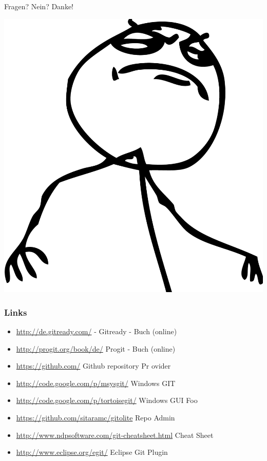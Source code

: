 \documentclass{beamer}
\begin{document}
			\begin{frame}
				Fragen? Nein? Danke!

				\begin{center}
					\includegraphics[height=0.4\textheight]{img/fuck-yeah}
				\end{center}
			\end{frame}

			\begin{frame}
				\frametitle{Links}

				\begin{itemize}
					\item{\url{http://de.gitready.com/} - Gitready - Buch (online)}
					\item{\url{http://progit.org/book/de/} Progit - Buch (online)}
					\item{\url{https://github.com/} Github repository Pr ovider}
					\item{\url{http://code.google.com/p/msysgit/} Windows GIT}
					\item{\url{http://code.google.com/p/tortoisegit/} Windows GUI Foo}
					\item{\url{https://github.com/sitaramc/gitolite} Repo Admin}
					\item{\url{http://www.ndpsoftware.com/git-cheatsheet.html} Cheat Sheet}
					\item{\url{http://www.eclipse.org/egit/} Eclipse Git Plugin}
				\end{itemize}
			\end{frame}
\end{document}
